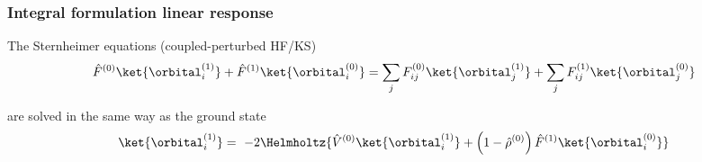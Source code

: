 \begin{frame}
    \frametitle{Integral formulation linear response}
    \centering
    The Sternheimer equations (coupled-perturbed HF/KS)
    \begin{equation}
        \nonumber
        \hat{F}^{(0)}\ket{\orbital_i^{(1)}} + \hat{F}^{(1)}\ket{\orbital_i^{(0)}} = 
        \sum_jF_{ij}^{(0)}\ket{\orbital_j^{(1)}} + \sum_j F_{ij}^{(1)}\ket{\orbital_j^{(0)}}
    \end{equation}

    \vspace{10mm}

    are solved in the same way as the ground state
    \begin{equation}
        \nonumber
        \ket{\orbital_i^{(1)}} =\
        -2\Helmholtz{\hat{V}^{(0)}\ket{\orbital_i^{(1)}}
        + \left(1 - \hat{\rho}^{(0)}\right)\hat{F}^{(1)}\ket{\orbital_i^{(0)}}}
    \end{equation}


\end{frame}

